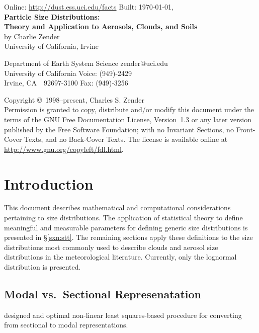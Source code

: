 \documentclass[12pt,twoside]{article}
\begin{document}

\begin{center}
Online: \url{http://dust.ess.uci.edu/facts} \hfill Built: \shortdate\today, \xxivtime\\
\bigskip
{\Large \textbf{Particle Size Distributions:\\ 
Theory and Application to Aerosols, Clouds, and Soils}}\\
\bigskip
by Charlie Zender\\
University of California, Irvine\\
\end{center}
Department of Earth System Science \hfill zender@uci.edu\\
University of California \hfill Voice: (949)-2429\\
Irvine, CA~~92697-3100 \hfill Fax: (949)-3256

\bigskip\noindent
Copyright \copyright\ 1998--present, Charles S. Zender\\
Permission is granted to copy, distribute and/or modify this document
under the terms of the GNU Free Documentation License, Version~1.3
or any later version published by the Free Software Foundation;
with no Invariant Sections, no Front-Cover Texts, and no Back-Cover
Texts.
The license is available online at
\url{http://www.gnu.org/copyleft/fdl.html}.

\setcounter{page}{1}
\pagestyle{headings}
\thispagestyle{empty}
\tableofcontents
\listoftables
{}
\setcounter{page}{1}
\thispagestyle{empty}

\section{Introduction}\label{sxn:ntr}

This document describes mathematical and computational considerations 
pertaining to size distributions.
The application of statistical theory to define meaningful and
measurable parameters for defining generic size distributions is
presented in \S\ref{sxn:stt}.
The remaining sections apply these definitions to the size
distributions most commonly used to describe clouds and aerosol size
distributions in the meteorological literature.
Currently, only the lognormal distribution is presented.

\subsection[Modal vs.\ Sectional Represenatation]{Modal vs.\ Sectional Represenatation}
\cite{LuB04} designed and optimal non-linear least squares-based
procedure for converting from sectional to modal representations.
\end{document}
